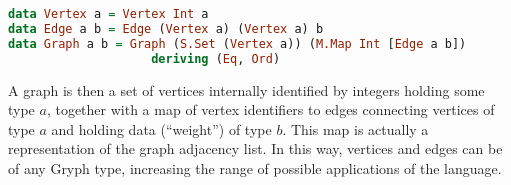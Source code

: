 \begin{lstlisting}[language=Haskell, basicstyle=\footnotesize]
data Vertex a = Vertex Int a
data Edge a b = Edge (Vertex a) (Vertex a) b
data Graph a b = Graph (S.Set (Vertex a)) (M.Map Int [Edge a b]) 
                    deriving (Eq, Ord)
\end{lstlisting}

A graph is then a set of vertices internally identified by integers holding some type $a$, together with
a map of vertex identifiers to edges connecting vertices of type $a$ and holding data (``weight'')
of type $b$. This map is actually a representation of the graph adjacency list. 
In this way, vertices and edges can be of any Gryph type, increasing the range of possible applications of the language.


